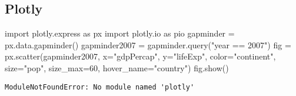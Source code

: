 \documentclass[
  letterpaper,
  DIV=11,
  numbers=noendperiod]{scrartcl}
\newenvironment{Shaded}{\begin{snugshade}}{\end{snugshade}}
\newcommand{\DecValTok}[1]{\textcolor[rgb]{0.68,0.00,0.00}{#1}}
\newcommand{\ImportTok}[1]{\textcolor[rgb]{0.00,0.46,0.62}{#1}}
\newcommand{\NormalTok}[1]{\textcolor[rgb]{0.00,0.23,0.31}{#1}}
\newcommand{\OperatorTok}[1]{\textcolor[rgb]{0.37,0.37,0.37}{#1}}
\newcommand{\StringTok}[1]{\textcolor[rgb]{0.13,0.47,0.30}{#1}}
\begin{document}
\hypertarget{plotly}{%
\subsection{Plotly}\label{plotly}}

\begin{Shaded}
\begin{Highlighting}[]
\ImportTok{import}\NormalTok{ plotly.express }\ImportTok{as}\NormalTok{ px}
\ImportTok{import}\NormalTok{ plotly.io }\ImportTok{as}\NormalTok{ pio}
\NormalTok{gapminder }\OperatorTok{=}\NormalTok{ px.data.gapminder()}
\NormalTok{gapminder2007 }\OperatorTok{=}\NormalTok{ gapminder.query(}\StringTok{"year == 2007"}\NormalTok{)}
\NormalTok{fig }\OperatorTok{=}\NormalTok{ px.scatter(gapminder2007, }
\NormalTok{                 x}\OperatorTok{=}\StringTok{"gdpPercap"}\NormalTok{, y}\OperatorTok{=}\StringTok{"lifeExp"}\NormalTok{, color}\OperatorTok{=}\StringTok{"continent"}\NormalTok{, }
\NormalTok{                 size}\OperatorTok{=}\StringTok{"pop"}\NormalTok{, size\_max}\OperatorTok{=}\DecValTok{60}\NormalTok{,}
\NormalTok{                 hover\_name}\OperatorTok{=}\StringTok{"country"}\NormalTok{)}
\NormalTok{fig.show()}
\end{Highlighting}
\end{Shaded}

\begin{verbatim}
ModuleNotFoundError: No module named 'plotly'
\end{verbatim}
\end{document}
